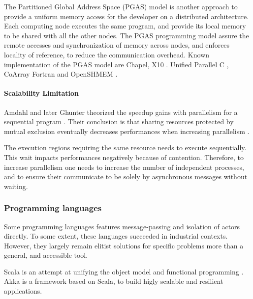 The Partitioned Global Address Space (PGAS) model is another approach to provide a uniform memory access for the developer on a distributed architecture.
Each computing node executes the same program, and provide its local memory to be shared with all the other nodes.
The PGAS programming model assure the remote accesses and synchronization of memory across nodes, and enforces locality of reference, to reduce the communication overhead.
Known implementation of the PGAS model are 
Chapel\cite{Chamberlain2007},
X10 \cite{Charles2005}.
Unified Parallel C \cite{El-Ghazawi2006},
CoArray Fortran \cite{Numrich1998} and
OpenSHMEM \cite{Chapman2010}.

\paragraph{Scalability Limitation}

Amdahl and later Ghunter theorized the speedup gains with parallelism for a sequential program \cite{Amdahl1967}.
Their conclusion is that sharing resources protected by mutual exclusion eventually decreases performances when increasing parallelism \cite{Gustafson1988,Gunther1993,Gunther1996,Nelson1996,Gunther2002}.

The execution regions requiring the same resource needs to execute sequentially.
This wait impacts performances negatively because of contention.
Therefore, to increase parallelism one needs to increase the number of independent processes, and to ensure their communicate to be solely by asynchronous messages without waiting.

\subsubsection{Programming languages}


Some programming languages features message-passing and isolation of actors directly.
To some extent, these languages succeeded in industrial contexts.
However, they largely remain elitist solutions for specific problems more than a general, and accessible tool.

Scala is an attempt at unifying the object model and functional programming \cite{Odersky2004}.
Akka is a framework based on Scala, to build higly scalable and resilient applications.

